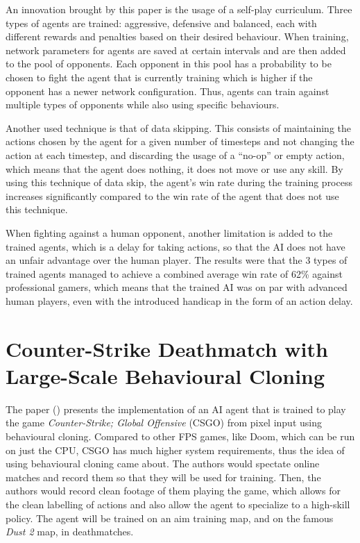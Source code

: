 An innovation brought by this paper is the usage of a self-play curriculum. Three types of agents are trained: aggressive, defensive and balanced, each with different rewards and penalties based on their desired behaviour. When training, network parameters for agents are saved at certain intervals and are then added to the pool of opponents. Each opponent in this pool has a probability to be chosen to fight the agent that is currently training which is higher if the opponent has a newer network configuration. Thus, agents can train against multiple types of opponents while also using specific behaviours.

Another used technique is that of data skipping. This consists of maintaining the actions chosen by the agent for a given number of timesteps and not changing the action at each timestep, and discarding the usage of a \enquote{no-op} or empty action, which means that the agent does nothing, it does not move or use any skill. By using this technique of data skip, the agent's win rate during the training process increases significantly compared to the win rate of the agent that does not use this technique.

When fighting against a human opponent, another limitation is added to the trained agents, which is a delay for taking actions, so that the AI does not have an unfair advantage over the human player. The results were that the 3 types of trained agents managed to achieve a combined average win rate of 62\% against professional gamers, which means that the trained AI was on par with advanced human players, even with the introduced handicap in the form of an action delay.



\section{Counter-Strike Deathmatch with Large-Scale Behavioural Cloning}
The paper (\cite{pearce2021counterstrike}) presents the implementation of an AI agent that is trained to play the game \emph{Counter-Strike; Global Offensive} (CSGO) from pixel input using behavioural cloning. Compared to other FPS games, like Doom, which can be run on just the CPU, CSGO has much higher system requirements, thus the idea of using behavioural cloning came about. The authors would spectate online matches and record them so that they will be used for training. Then, the authors would record clean footage of them playing the game, which allows for the clean labelling of actions and also allow the agent to specialize to a high-skill policy. The agent will be trained on an aim training map, and on the famous \emph{Dust 2} map, in deathmatches.

